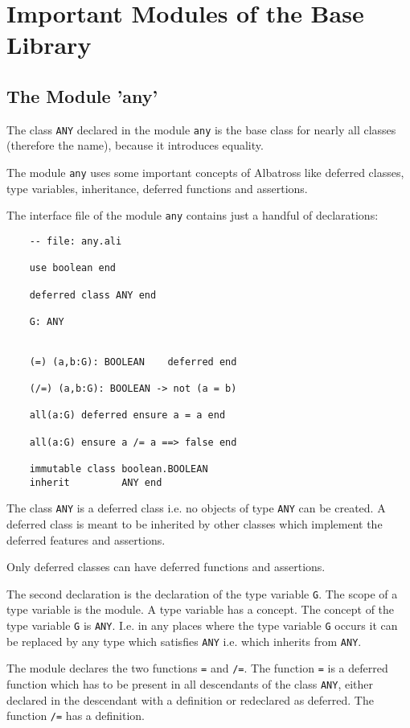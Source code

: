 \section{Important Modules of the Base Library}

\subsection{The Module 'any'}

The class \lstinline!ANY! declared in the module \lstinline!any! is the base
class for nearly all classes (therefore the name), because it introduces
equality.

The module \lstinline!any! uses some important concepts of Albatross
like deferred classes, type variables, inheritance, deferred functions and
assertions.

The interface file of the module \lstinline!any! contains just a handful of
declarations:

\begin{lstlisting}
    -- file: any.ali

    use boolean end

    deferred class ANY end

    G: ANY


    (=) (a,b:G): BOOLEAN    deferred end

    (/=) (a,b:G): BOOLEAN -> not (a = b)

    all(a:G) deferred ensure a = a end

    all(a:G) ensure a /= a ==> false end

    immutable class boolean.BOOLEAN
    inherit         ANY end
\end{lstlisting}

The class \lstinline!ANY! is a deferred class i.e. no objects of type
\lstinline!ANY! can be created. A deferred class is meant to be inherited by
other classes which implement the deferred features and assertions.

Only deferred classes can have deferred functions and assertions.

The second declaration is the declaration of the type variable
\lstinline!G!. The scope of a type variable is the module. A type variable has
a concept. The concept of the type variable \lstinline!G! is
\lstinline!ANY!. I.e. in any places where the type variable \lstinline!G!
occurs it can be replaced by any type which satisfies \lstinline!ANY!
i.e. which inherits from \lstinline!ANY!.

The module declares the two functions \lstinline!=! and \lstinline!/=!. The
function \lstinline!=! is a deferred function which has to be present in all
descendants of the class \lstinline!ANY!, either declared in the descendant
with a definition or redeclared as deferred. The function \lstinline!/=! has a
definition.

